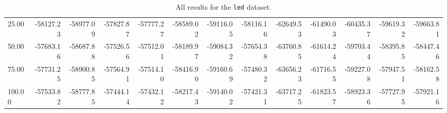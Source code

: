 \begin{table*}
{\begin{tabular}{l|rrrrrrrrrrrr}
    25.00 & -58127.23 & -58977.09 & -57827.87 & -57777.27 & -58589.02 & -59116.05 & -58116.16 & -62649.53 & -61490.03 & -60435.37 & -59619.32 & -59663.81 \\
    50.00 & -57683.16 & -58687.88 & -57526.56 & -57512.01 & -58189.97 & -59084.32 & -57654.38 & -63760.85 & -61614.24 & -59703.44 & -58395.85 & -58447.46 \\
    75.00 & -57731.25 & -58900.85 & -57564.91 & -57514.10 & -58416.90 & -59160.69 & -57480.32 & -63656.23 & -61716.55 & -59227.08 & -57947.51 & -58162.58 \\
    100.00 & -57533.82 & -58777.85 & -57444.14 & -57432.12 & -58217.43 & -59140.02 & -57421.31 & -63717.25 & -61823.57 & -58923.36 & -57727.95 & -57921.16 \\
    \hline
  \end{tabular}
  }
  \caption{All results for the \texttt{led} dataset.}
  \label{tab:all-led}
\end{table*}

